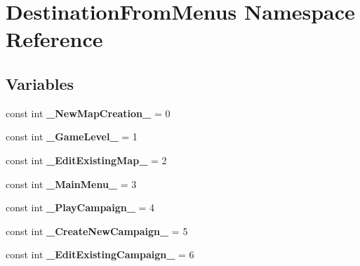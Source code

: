 \hypertarget{namespace_destination_from_menus}{}\section{Destination\+From\+Menus Namespace Reference}
\label{namespace_destination_from_menus}
\subsection*{Variables}
\begin{DoxyCompactItemize}
\item 
\hypertarget{namespace_destination_from_menus_a73977a68c2151de6d653a97900791915}{}\label{namespace_destination_from_menus_a73977a68c2151de6d653a97900791915} 
const int {\bfseries \+\_\+\+New\+Map\+Creation\+\_\+} = 0
\item 
\hypertarget{namespace_destination_from_menus_ac4e6260433e735602ab4fbb5b62747e2}{}\label{namespace_destination_from_menus_ac4e6260433e735602ab4fbb5b62747e2} 
const int {\bfseries \+\_\+\+Game\+Level\+\_\+} = 1
\item 
\hypertarget{namespace_destination_from_menus_a54dff874fdefc4f5e756cd444b1727ce}{}\label{namespace_destination_from_menus_a54dff874fdefc4f5e756cd444b1727ce} 
const int {\bfseries \+\_\+\+Edit\+Existing\+Map\+\_\+} = 2
\item 
\hypertarget{namespace_destination_from_menus_a7e14519f2a41371e0bbab4a813c06a10}{}\label{namespace_destination_from_menus_a7e14519f2a41371e0bbab4a813c06a10} 
const int {\bfseries \+\_\+\+Main\+Menu\+\_\+} = 3
\item 
\hypertarget{namespace_destination_from_menus_a33e62213d04cc6e7df593e53ecf9d035}{}\label{namespace_destination_from_menus_a33e62213d04cc6e7df593e53ecf9d035} 
const int {\bfseries \+\_\+\+Play\+Campaign\+\_\+} = 4
\item 
\hypertarget{namespace_destination_from_menus_a2475313bf1879260187b027dac2d4f92}{}\label{namespace_destination_from_menus_a2475313bf1879260187b027dac2d4f92} 
const int {\bfseries \+\_\+\+Create\+New\+Campaign\+\_\+} = 5
\item 
\hypertarget{namespace_destination_from_menus_abb14f3335b036cc1c9ed6718e1170a79}{}\label{namespace_destination_from_menus_abb14f3335b036cc1c9ed6718e1170a79} 
const int {\bfseries \+\_\+\+Edit\+Existing\+Campaign\+\_\+} = 6
\item 
\hypertarget{namespace_destination_from_menus_ab4da27ca9d52304e1d9fcb976d176c62}{}\label{namespace_destination_from_menus_ab4da27ca9d52304e1d9fcb976d176c62} 

\end{DoxyCompactItemize}
